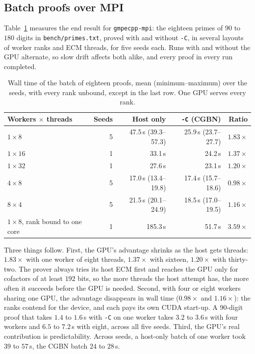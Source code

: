 \documentclass[11pt,a4paper]{article}
\newcommand{\code}[1]{\texttt{#1}}
\begin{document}
\subsection{Batch proofs over MPI}

Table~\ref{tab:mpicgbn} measures the end result for \code{gmpecpp-mpi}: the eighteen primes of
$90$ to $180$ digits in \code{bench/primes.txt}, proved with and without \code{-C}, in several
layouts of worker ranks and ECM threads, for five seeds each. Runs with and without the GPU
alternate, so slow drift affects both alike, and every proof in every run completed.

\begin{table}[t]
\centering
\begin{tabular}{lrrrr}
\toprule
Workers $\times$ threads & Seeds & Host only & \code{-C} (CGBN) & Ratio \\
\midrule
$1 \times 8$  & 5 & 47.5\,s (39.3--57.3) & 25.9\,s (23.7--27.7) & $1.83\times$ \\
$1 \times 16$ & 1 & 33.1\,s & 24.2\,s & $1.37\times$ \\
$1 \times 32$ & 1 & 27.6\,s & 23.1\,s & $1.20\times$ \\
$4 \times 8$  & 5 & 17.0\,s (13.4--19.8) & 17.4\,s (15.7--18.6) & $0.98\times$ \\
$8 \times 4$  & 5 & 21.5\,s (20.1--24.9) & 18.5\,s (17.0--19.5) & $1.16\times$ \\
\midrule
$1 \times 8$, rank bound to one core & 1 & 185.3\,s & 51.7\,s & $3.59\times$ \\
\bottomrule
\end{tabular}
\caption{Wall time of the batch of eighteen proofs, mean (minimum--maximum) over the seeds,
  with every rank unbound, except in the last row. One GPU serves every rank.}
\label{tab:mpicgbn}
\end{table}

Three things follow. First, the GPU's advantage shrinks as the host gets threads: $1.83\times$
with one worker of eight threads, $1.37\times$ with sixteen, $1.20\times$ with thirty-two. The
prover always tries its host ECM first and reaches the GPU only for cofactors of at least $192$
bits, so the more threads the host attempt has, the more often it succeeds before the GPU is
needed. Second, with four or eight workers sharing one GPU, the advantage disappears in wall
time ($0.98\times$ and $1.16\times$): the ranks contend for the device, and each pays its own
CUDA start-up. A 90-digit proof that takes $1.4$ to $1.6$\,s with \code{-C} on one worker takes
$3.2$ to $3.6$\,s with four workers and $6.5$ to $7.2$\,s with eight, across all five seeds. Third, the GPU's real contribution is predictability. Across seeds, a host-only
batch of one worker took $39$ to $57$\,s, the CGBN batch $24$ to $28$\,s.
\end{document}
